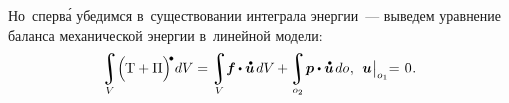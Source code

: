 \begin{otherlanguage}{russian}
Но~сперв\'{а} убедимся в~существовании интеграла энергии~--- выведем уравнение баланса механической энергии в~линейной модели:
\begin{equation}\label{dynamicsoflineartheory:integralofenergy}
\integral\displaylimits_V \hspace{-0.42ex} \left(^{\mathstrut} \hspace{-0.2ex} \mathrm{T} + \Pi \right)^{\hspace{-0.12em}\tikz[baseline=-0.2ex] \draw[black, fill=black] (0,0) circle (.28ex);} \hspace{-0.25ex} dV =
\integral\displaylimits_V \hspace{-0.5ex} \bm{f} \hspace{-0.1ex} \dotp \mathdotabove{\bm{u}} \hspace{0.25ex} dV \hspace{-0.1ex} + \hspace{-0.12ex}
\integral\displaylimits_{o_2} \hspace{-0.32ex} \bm{p} \dotp \mathdotabove{\bm{u}} \hspace{0.25ex} do \hspace{.1ex}, \:\:
\bm{u} \hspace{0.1ex} \bigr|_{o_1} \hspace{-0.64ex} = \hspace{0.2ex} 0 \hspace{.1ex}.
\end{equation}


\end{otherlanguage}
